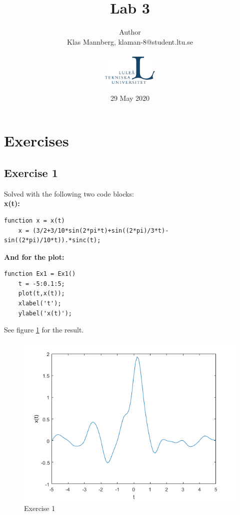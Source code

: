 \documentclass[a4paper]{article}
\title{Lab 3}
\author{
Author \\
{Klas Mannberg,   klaman-8@student.ltu.se
} \\ \\
\includegraphics[width=0.2\textwidth]{ltu_swe.jpg}}
\date{29 May 2020}
\begin{document}
\maketitle

\section{Exercises}
\subsection{Exercise 1}
Solved with the following two code blocks: \\
\textbf{x(t):}
\begin{lstlisting}
function x = x(t)
    x = (3/2+3/10*sin(2*pi*t)+sin((2*pi)/3*t)-sin((2*pi)/10*t)).*sinc(t);
\end{lstlisting}
\textbf{And for the plot:}
\begin{lstlisting}
function Ex1 = Ex1()
    t = -5:0.1:5;
    plot(t,x(t));
    xlabel('t');
    ylabel('x(t)');
\end{lstlisting}
See figure \ref{fig:1} for the result.
\begin{figure}
    \centering
    \includegraphics{1.png}
    \caption{Exercise 1}
    \label{fig:1}
\end{figure}
\end{document}
